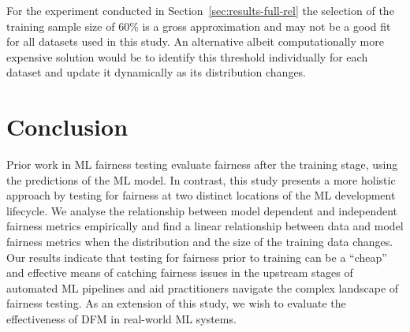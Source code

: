 \documentclass{article}
\begin{document}

For the experiment conducted in Section \ref{sec:results-full-rel} the
selection of the training sample size of 60\% is a gross approximation
and may not be a good fit for all datasets used in this study. An
alternative albeit computationally more expensive solution would be to
identify this threshold individually for each dataset and update it
dynamically as its distribution changes.

\section{Conclusion}\label{sec:conclude}

Prior work in ML fairness testing evaluate fairness after the training
stage, using the predictions of the ML model. In contrast, this study
presents a more holistic approach by testing for fairness at two
distinct locations of the ML development lifecycle. We analyse the
relationship between model dependent and independent fairness metrics
empirically and find a linear relationship between data and model
fairness metrics when the distribution and the size of the training
data changes. Our results indicate that testing for fairness prior to
training can be a ``cheap'' and effective means of catching fairness
issues in the upstream stages of automated ML pipelines and aid
practitioners navigate the complex landscape of fairness testing. As
an extension of this study, we wish to evaluate the effectiveness of
DFM in real-world ML systems.



\end{document}
